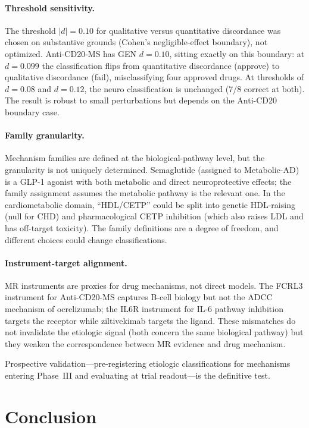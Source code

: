 \documentclass[11pt]{article}
\begin{document}
\paragraph{Threshold sensitivity.} The threshold $|d| = 0.10$ for qualitative versus quantitative discordance was chosen on substantive grounds (Cohen's negligible-effect boundary), not optimized. Anti-CD20-MS has GEN $d = 0.10$, sitting exactly on this boundary: at $d = 0.099$ the classification flips from quantitative discordance (approve) to qualitative discordance (fail), misclassifying four approved drugs. At thresholds of $d = 0.08$ and $d = 0.12$, the neuro classification is unchanged (7/8 correct at both). The result is robust to small perturbations but depends on the Anti-CD20 boundary case.

\paragraph{Family granularity.} Mechanism families are defined at the biological-pathway level, but the granularity is not uniquely determined. Semaglutide (assigned to Metabolic-AD) is a GLP-1 agonist with both metabolic and direct neuroprotective effects; the family assignment assumes the metabolic pathway is the relevant one. In the cardiometabolic domain, ``HDL/CETP'' could be split into genetic HDL-raising (null for CHD) and pharmacological CETP inhibition (which also raises LDL and has off-target toxicity). The family definitions are a degree of freedom, and different choices could change classifications.

\paragraph{Instrument-target alignment.} MR instruments are proxies for drug mechanisms, not direct models. The FCRL3 instrument for Anti-CD20-MS captures B-cell biology but not the ADCC mechanism of ocrelizumab; the IL6R instrument for IL-6 pathway inhibition targets the receptor while ziltivekimab targets the ligand. These mismatches do not invalidate the etiologic signal (both concern the same biological pathway) but they weaken the correspondence between MR evidence and drug mechanism.

Prospective validation---pre-registering etiologic classifications for mechanisms entering Phase~III and evaluating at trial readout---is the definitive test.

\section{Conclusion}
\end{document}
